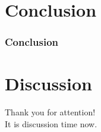 \documentclass{beamer}
\begin{document}
\section{Conclusion}

\begin{frame}
  \frametitle{Conclusion}
\end{frame}

\section{Discussion}

\begin{frame}
\begin{center}
  Thank you for attention!\\
  It is discussion time now.
\end{center}
\end{frame}
\end{document}
